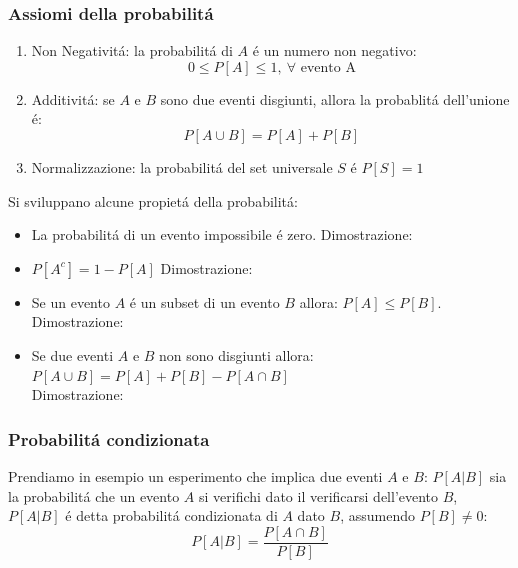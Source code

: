         \subsubsection{Assiomi della probabilitá}
            \begin{enumerate}
                \item \label{Ass. Prob. 1}{Non Negativitá: la probabilitá di $A$ é un numero non negativo:
                    \[
                        0\leq P[A] \leq 1,\ \forall \text{ evento A}
                    \]
                }
                \item \label{Ass. Prob. 2}{Additivitá: se $A$ e $B$ sono due eventi disgiunti, allora la probablitá dell'unione é: 
                    \[
                        P[A\cup B] = P[A] + P[B] 
                    \]
                }
                \item \label{Ass. Prob. 3}{Normalizzazione: la probabilitá del set universale $S$ é $P[S] = 1$}
            \end{enumerate}
            Si sviluppano alcune propietá della probabilitá:
            \begin{itemize}
                \item {
                    La probabilitá di un evento impossibile é zero.
                    Dimostrazione:
                }
                \item {
                    $P[A^c] = 1-P[A]$
                    Dimostrazione:
                }
                \item {
                    Se un evento $A$ é un subset di un evento $B$ allora: $P[A]\leq P[B]$. 
                    Dimostrazione: 
                }
                \item {
                    \begin{sloppypar}
                        Se due eventi $A$ e $B$ non sono disgiunti allora: ${P[A \cup B]= P[A] + P[B] -  P[A\cap B]}$\\
                        Dimostrazione:
                    \end{sloppypar}
                }
            \end{itemize}
        \subsubsection{Probabilitá condizionata}\label{Probabilitá condizionata}
            Prendiamo in esempio un esperimento che implica due eventi $A$ e $B$: $P[A|B]$ sia la probabilitá che un evento $A$ si verifichi
            dato il verificarsi dell'evento $B$, $P[A|B]$ é detta probabilitá condizionata di $A$ dato $B$, assumendo $P[B]\neq 0$:
            \[
                P[A|B] = \frac{P[A\cap B]}{P[B]}
            \]

